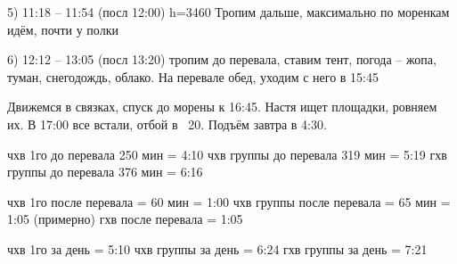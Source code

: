 5) 11:18 -- 11:54 (посл 12:00) h=3460 Тропим дальше, максимально по моренкам идём, почти у полки

6) 12:12 -- 13:05 (посл 13:20) тропим до перевала, ставим тент, погода -- жопа, туман, снегодождь, облако. На перевале обед, уходим с него в 15:45


Движемся в связках, спуск до морены к 16:45.
Настя ищет площадки, ровняем их. В 17:00 все встали, отбой в ~20. Подъём завтра в 4:30.

чхв 1го до перевала 250 мин = 4:10
чхв группы до перевала 319 мин = 5:19
гхв группы до перевала 376 мин = 6:16

чхв 1го после перевала = 60 мин = 1:00
чхв группы после перевала = 65 мин = 1:05 (примерно)
гхв после перевала = 1:05

чхв 1го за день = 5:10
чхв группы за день = 6:24
гхв группы за день = 7:21

    \FloatBarrier
